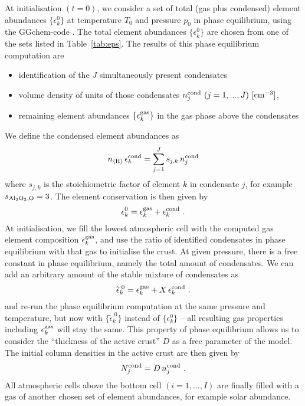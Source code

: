 \documentclass[11pt]{article}
\def\nH{n_{\langle\rm H\rangle}}
\begin{document}
At initialisation $(t=0)$, we consider a set of total (gas plus
condensed) element abundances $\{\epsilon_k^0\}$ at temperature
$T_0$ and pressure $p_0$ in phase equilibrium, using the {\sc
  GGchem}-code \citep{Woitke2017}.  The total element abundances
$\{\epsilon_k^0\}$ are chosen from one of the sets listed in
Table~\ref{tab:eps}. The results of this phase equilibrium 
computation are
\begin{itemize}
\itemsep=-1pt
\parsep=0pt
  \item identification of the $J$ simultaneously present 
        condensates 
  \item volume density of units of those condensates
        $n_j^{\rm cond}\ (j=1,...,J)\ \rm[cm^{-3}]$,
  \item remaining element abundances $\{\epsilon_k^{\rm gas}\}$ in the gas
        phase above the condensates
\end{itemize}
We define the condensed element abundances as
\begin{equation}
  \nH\,\epsilon_k^{\rm cond} = \sum_{j=1}^J s_{j,k}\,n_j^{\rm cond}
\end{equation}
where $s_{j,k}$ is the stoichiometric factor of element $k$ in
condensate $j$, for example $s_{\rm Al_2O_3,O}=3$. The element
conservation is then given by
\begin{equation}
  \epsilon_k^0 = \epsilon_k^{\rm gas} + \epsilon_k^{\rm cond} \ .
\end{equation}
At initialisation, we fill the lowest atmospheric cell with the
computed  gas element composition $\epsilon_k^{\rm gas}$, and use 
the ratio of identified condensates in phase equilibrium with that gas to
initialise the crust. At given pressure, there is a free constant in
phase equilibrium, namely the total amount of condensates. We can add
an arbitrary amount of the stable mixture of condensates as
\begin{equation}
  \widetilde{\epsilon}_k^{\;0} = \epsilon_k^{\rm gas} 
                           + X\,\epsilon_k^{\rm cond} \ .
\end{equation}
and re-run the phase equilibrium computation at the same pressure
and temperature, but now with $\{\widetilde\epsilon_k^{\;0}\}$ instead of
$\{\epsilon_k^0\}$ -- all resulting gas properties including $\epsilon_k^{\rm
  gas}$ will stay the same.  This property of phase equilibrium allows us
to consider the ``thickness of the active crust'' $D$ as a free 
parameter of the model. The initial column densities in the active crust are
then given by
\begin{equation}
  N_j^{\rm cond} = D\,n_j^{\rm cond}  \ .
\end{equation}
All atmospheric cells above the bottom cell $(i=1,...,I)$ are finally
filled with a gas of another chosen set of element abundances, for
example solar abundance.
\end{document}

